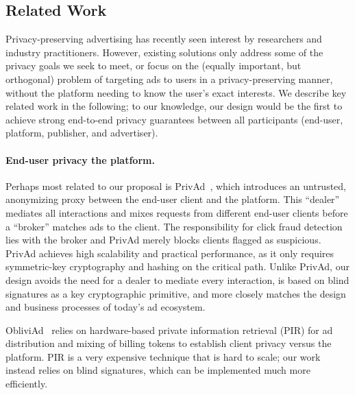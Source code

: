 %
%
%


\subsection{Related Work}
\label{s:bg-related}
%
Privacy-preserving advertising has recently seen interest by researchers and industry practitioners.
%
However, existing solutions only address some of the privacy goals we seek to meet, or focus on the (equally important, but orthogonal) problem of targeting ads to users in a privacy-preserving manner, \ie without the platform needing to know the user's exact interests.
%
We describe key related work in the following; to our knowledge, our design would be the first to achieve strong end-to-end privacy guarantees between all participants (end-user, platform, publisher, and advertiser).
%

\paragraph{End-user privacy \vs the platform.}
%
Perhaps most related to our proposal is PrivAd~\cite{privad}, which introduces
an untrusted, anonymizing proxy between the end-user client and the platform.
%
This ``dealer'' mediates all interactions and mixes requests from different
end-user clients before a ``broker'' matches ads to the client.
%
The responsibility for click fraud detection lies with the broker and PrivAd
merely blocks clients flagged as suspicious.
%
PrivAd achieves high scalability and practical performance, as it only requires
symmetric-key cryptography and hashing on the critical path.
%
Unlike PrivAd, our design avoids the need for a dealer to mediate every
interaction, is based on blind signatures as a key cryptographic primitive,
and more closely matches the design and business processes of today's
ad ecosystem.
%

%
ObliviAd~\cite{obliviad} relies on hardware-based private information retrieval
(PIR) for ad distribution and mixing of billing tokens to establish client
privacy versus the platform.
%
PIR is a very expensive technique that is hard to scale; our work instead relies
on blind signatures, which can be implemented much more efficiently.
%

